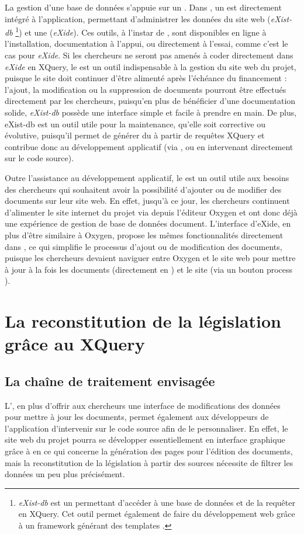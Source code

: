 La gestion d'une base de données s'appuie sur un \SGBD. Dans \tp, un \SGBD est directement intégré à l'application, permettant d'administrer les données du site web (\textit{eXist-db} \footnote{\textit{eXist-db} est un \SGBD permettant d'accéder à une base de données et de la requêter en XQuery. Cet outil permet également de faire du développement web grâce à un framework générant des templates \HTML.}) et une \IDE (\textit{eXide}). Ces outils, à l'instar de \tp, sont disponibles en ligne à l'installation, documentation à l'appui, ou directement à l'essai, comme c'est le cas pour \textit{eXide}. Si les chercheurs ne seront pas amenés à coder directement dans \textit{eXide} en XQuery, le \SGBD est un outil indispensable à la gestion du site web du projet, puisque le site doit continuer d'être alimenté après l'échéance du financement : l'ajout, la modification ou la suppression de documents pourront être effectués directement par les chercheurs, puisqu'en plus de bénéficier d'une documentation solide, \textit{eXist-db} possède une interface simple et facile à prendre en main. De plus, eXist-db est un outil utile pour la maintenance, qu'elle soit corrective ou évolutive, puisqu'il permet de générer du \HTML à partir de requêtes XQuery et contribue donc au développement applicatif (via \tp, ou en intervenant directement sur le code source). 

Outre l'assistance au développement applicatif, le \SGBD est un outil utile aux besoins des chercheurs qui souhaitent avoir la possibilité d'ajouter ou de modifier des documents sur leur site web. En effet, jusqu'à ce jour, les chercheurs continuent d'alimenter le site internet du projet \LSC via \FTP depuis l'éditeur \XML Oxygen et ont donc déjà une expérience de gestion de base de données document. L'interface d'eXide, en plus d'être similaire à Oxygen, propose les mêmes fonctionnalités directement dans \tp, ce qui simplifie le processus d'ajout ou de modification des documents, puisque les chercheurs devaient naviguer entre Oxygen et le site web \LSC pour mettre à jour à la fois les documents (directement en \XML) et le site (via un bouton \og process \XML \fg). 

 \section{La reconstitution de la législation grâce au XQuery}
    \subsection{La chaîne de traitement envisagée}
L'\IDE, en plus d'offrir aux chercheurs une interface de modifications des données \XML pour mettre à jour les documents, permet également aux développeurs de l'application d'intervenir sur le code source afin de le personnaliser. En effet, le site web du projet pourra se développer essentiellement en interface graphique grâce à \tp en ce qui concerne la génération des pages \HTML pour l'édition des documents, mais la reconstitution de la législation à partir des sources nécessite de filtrer les données un peu plus précisément. 

